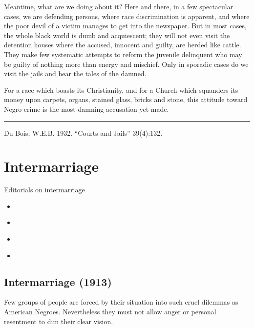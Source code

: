 \documentclass[letterpaper,10pt,english]{jupyterBook}
\begin{document}
\sphinxAtStartPar
Meantime, what are we doing about it? Here and there, in a few spectacular cases, we are defending persons, where race discrimination is apparent, and where the poor devil of a victim manages to get into the newspaper. But in most cases, the whole black world is dumb and acquiescent; they will not even visit the detention houses where the accused, innocent and guilty, are herded like cattle. They make few systematic attempts to reform the juvenile delinquent who may be guilty of nothing more than energy and mischief. Only in sporadic cases do we visit the jails and hear the tales of the damned.

\sphinxAtStartPar
For a race which boasts its Christianity, and for a Church which squanders its money upon carpets, organs, stained glass, bricks and stone, this attitude toward Negro crime is the most damning accusation yet made.


\bigskip\hrule\bigskip


\sphinxAtStartPar
{} Du Bois, W.E.B. 1932. “Courts and Jails” 39(4):132.


\section{Intermarriage}
\label{\detokenize{Sections/intermarriage:intermarriage}}\label{\detokenize{Sections/intermarriage::doc}}
\sphinxAtStartPar
Editorials on intermarriage
\begin{itemize}
\item {} 
\sphinxAtStartPar
{\hyperref[\detokenize{Volumes/05/04/intermarriage::doc}]{}}

\item {} 
\sphinxAtStartPar
{\hyperref[\detokenize{Volumes/19/03/sex_equality::doc}]{}}

\item {} 
\sphinxAtStartPar
{\hyperref[\detokenize{Volumes/31/05/correspondence::doc}]{}}

\item {} 
\sphinxAtStartPar
{\hyperref[\detokenize{Volumes/37/02/interracial_love_in_texas::doc}]{}}

\end{itemize}


\subsection{Intermarriage (1913)}
\label{\detokenize{Volumes/05/04/intermarriage:intermarriage-1913}}\label{\detokenize{Volumes/05/04/intermarriage::doc}}
\sphinxAtStartPar
Few  groups of people are forced by their situation into such cruel dilem­mas as American Ne­groes. Nevertheless they must not allow anger or personal resentment to dim their clear vision.
\end{document}
